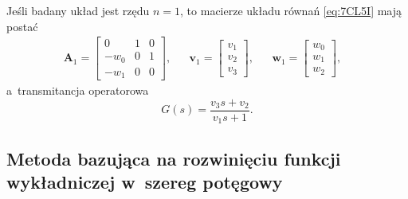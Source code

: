 \documentclass[paper=a4,DIV=12]{lpas}
\begin{document}
\begin{appendices}
  Jeśli badany układ jest rzędu $n=1$, to macierze układu równań
  \eqref{eq:7CL5I} mają postać
  \begin{equation}
    \begin{aligned}
      \mathbf{A}_1 = \begin{bmatrix}
         0    &    1 &    0 \\
         -w_0 &    0 &    1 \\
         -w_1 &    0 &    0
      \end{bmatrix}, &
      & \mathbf{v}_1 = \begin{bmatrix}
        v_1 \\ v_2 \\ v_3
      \end{bmatrix}, &
      & \mathbf{w}_1 = \begin{bmatrix}
        w_0 \\ w_1 \\  w_2
      \end{bmatrix}, &
    \end{aligned}
  \end{equation}
  a~transmitancja operatorowa
  \begin{equation}
    G(s) = \frac{v_3 s + v_2}{v_1 s + 1}.
  \end{equation}

  \subsection{Metoda bazująca na rozwinięciu funkcji wykładniczej w~szereg potęgowy}
  \label{eq:Q1UWQ}


\end{appendices}
\end{document}
